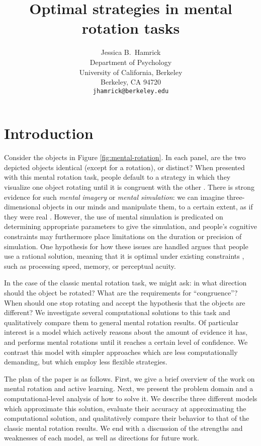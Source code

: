 \documentclass{article} %
\title{Optimal strategies in mental rotation tasks}
\author{Jessica B.~Hamrick\\
  Department of Psychology\\
  University of California, Berkeley\\
  Berkeley, CA 94720\\
  \texttt{jhamrick@berkeley.edu}}
\newcommand{\TODO}[1]{\textcolor{red}{[TODO: #1]}}
\begin{document}
\maketitle


\section{Introduction}


Consider the objects in Figure \ref{fig:mental-rotation}. In each
panel, are the two depicted objects identical (except for a rotation),
or distinct? When presented with this mental rotation task, people
default to a strategy in which they visualize one object rotating
until it is congruent with the other \cite{Shepard1971}. There is
strong evidence for such \textit{mental imagery} or \textit{mental
  simulation}: we can imagine three-dimensional objects in our minds
and manipulate them, to a certain extent, as if they were real
\cite{Kosslyn:2009tj}.  However, the use of mental simulation is
predicated on determining appropriate parameters to give the
simulation, and people's cognitive constraints may furthermore place
limitations on the duration or precision of simulation. One hypothesis
for how these issues are handled argues that people use a rational
solution, meaning that it is optimal under existing constraints
\cite{Lieder:2012wg,Vul:2009wy,Griffiths2012a}, such as processing
speed, memory, or perceptual acuity.

In the case of the classic mental rotation task, we might ask: in what
direction should the object be rotated?  What are the requirements for
``congruence''? When should one stop rotating and accept the
hypothesis that the objects are different? We investigate several
computational solutions to this task and qualitatively compare them to
general mental rotation results. Of particular interest is a model
which actively reasons about the amount of evidence it has, and
performs mental rotations until it reaches a certain level of
confidence. We contrast this model with simpler approaches which are
less computationally demanding, but which employ less flexible
strategies.

The plan of the paper is as follows. First, we give a brief overview
of the work on mental rotation and active learning. Next, we present
the problem domain and a computational-level analysis of how to solve
it. We describe three different models which approximate this
solution, evaluate their accuracy at approximating the computational
solution, and qualitatively compare their behavior to that of the
classic mental rotation results. We end with a discussion of the
strengths and weaknesses of each model, as well as directions for
future work.
\end{document}
